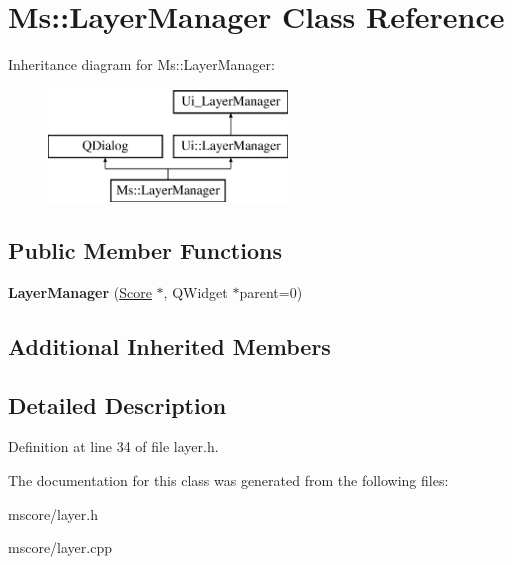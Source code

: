 \hypertarget{class_ms_1_1_layer_manager}{}\section{Ms\+:\+:Layer\+Manager Class Reference}
\label{class_ms_1_1_layer_manager}
Inheritance diagram for Ms\+:\+:Layer\+Manager\+:\begin{figure}[H]
\begin{center}
\leavevmode
\includegraphics[height=3.000000cm]{class_ms_1_1_layer_manager}
\end{center}
\end{figure}
\subsection*{Public Member Functions}
\begin{DoxyCompactItemize}
\item 
\mbox{\label{class_ms_1_1_layer_manager_ac9fc696ad413e60462a7608b672fb746}} 
{\bfseries Layer\+Manager} (\hyperlink{class_ms_1_1_score}{Score} $\ast$, Q\+Widget $\ast$parent=0)
\end{DoxyCompactItemize}
\subsection*{Additional Inherited Members}


\subsection{Detailed Description}


Definition at line 34 of file layer.\+h.



The documentation for this class was generated from the following files\+:\begin{DoxyCompactItemize}
\item 
mscore/layer.\+h\item 
mscore/layer.\+cpp\end{DoxyCompactItemize}
